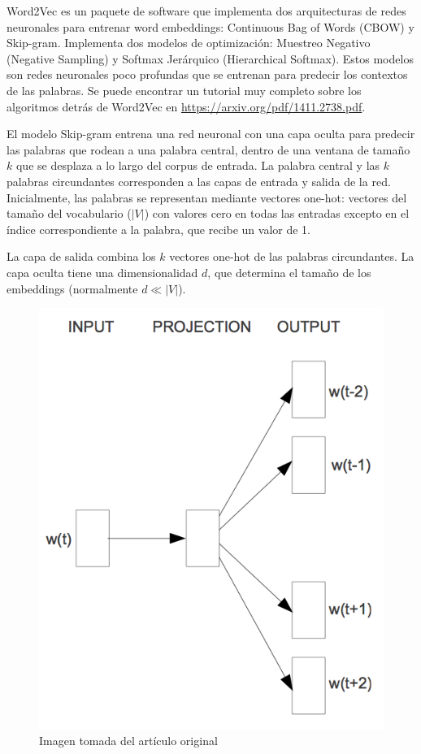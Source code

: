 Word2Vec es un paquete de software que implementa dos arquitecturas de redes neuronales para entrenar word embeddings: Continuous Bag of Words (CBOW) y Skip-gram.
Implementa dos modelos de optimización: Muestreo Negativo (Negative Sampling) y Softmax Jerárquico (Hierarchical Softmax).
Estos modelos son redes neuronales poco profundas que se entrenan para predecir los contextos de las palabras.
Se puede encontrar un tutorial muy completo sobre los algoritmos detrás de Word2Vec en \url{https://arxiv.org/pdf/1411.2738.pdf}.

El modelo Skip-gram entrena una red neuronal con una capa oculta para predecir las palabras que rodean a una palabra central, dentro de una ventana de tamaño $k$ que se desplaza a lo largo del corpus de entrada.
La palabra central y las $k$ palabras circundantes corresponden a las capas de entrada y salida de la red.
Inicialmente, las palabras se representan mediante vectores one-hot: vectores del tamaño del vocabulario ($|V|$) con valores cero en todas las entradas excepto en el índice correspondiente a la palabra, que recibe un valor de 1.


La capa de salida combina los $k$ vectores one-hot de las palabras circundantes.
La capa oculta tiene una dimensionalidad $d$, que determina el tamaño de los embeddings (normalmente $d \ll |V|$).

\begin{figure}[h]
\centering
\includegraphics[scale=0.4]{pics/skip-gram.png}
\caption{Imagen tomada del artículo original}
\end{figure}

